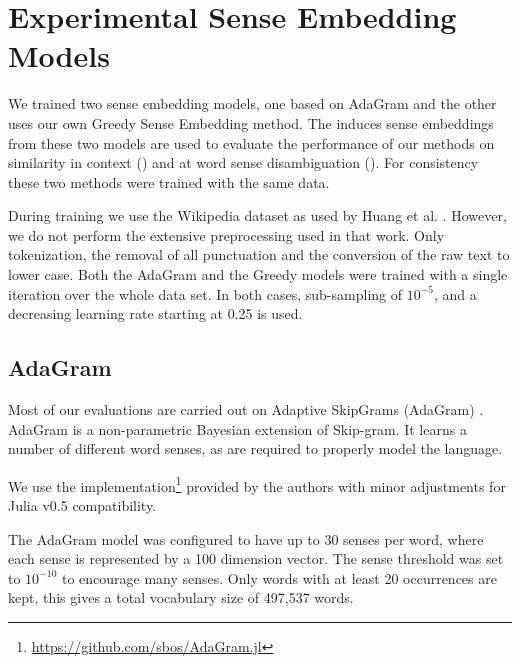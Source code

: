 \documentclass{article}
\def\parencite{\cite}
\begin{document}
\section{Experimental Sense Embedding Models} 
\label{Models}
We trained two sense embedding models, one based on AdaGram \parencite{AdaGrams} 
and the other uses our own Greedy Sense Embedding method. 
The induces sense embeddings from these two models are used to evaluate the performance of our methods on similarity in context () and at word sense disambiguation (). For consistency these two methods were trained with the same data.

During training we use the Wikipedia dataset as used by Huang et al. \parencite{Huang2012}.
However, we do not perform the extensive preprocessing used in that work.
Only tokenization, the removal of all punctuation and the conversion of the raw text to lower case.
Both the AdaGram and the Greedy models were trained with a single iteration over the whole data set.
In both cases, sub-sampling of $10^{-5}$, and a decreasing learning rate starting at 0.25 is used.

\subsection{AdaGram}
Most of our evaluations are carried out on Adaptive SkipGrams (AdaGram) \parencite{AdaGrams}. AdaGram is a non-parametric Bayesian extension of Skip-gram. It learns a number of different word senses, as are required to properly model the language.

We use the implementation\footnote{\url{https://github.com/sbos/AdaGram.jl}} provided by the authors with minor adjustments for Julia \parencite{Julia} v0.5 compatibility.


The AdaGram model was configured to have up to 30 senses per word, where each sense is represented by a 100 dimension vector. 
The sense threshold was set to $10^{-10}$ to encourage many senses.
Only words with at least 20 occurrences are kept, this gives a total vocabulary size of 497,537 words.


\end{document}
